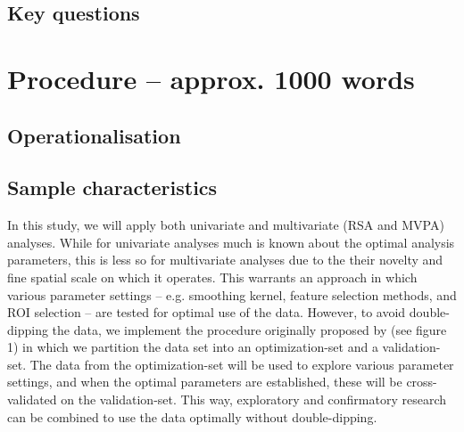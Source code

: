 \documentclass[12pt,a4paper]{article}\usepackage[]{graphicx}\usepackage[]{color}
\begin{document}
\subsection{Key questions}


\noindent
\wordcount 

\section{Procedure \textmd{– approx. 1000 words}}
\subsection{Operationalisation}

\subsection{Sample characteristics}
In this study, we will apply both univariate and multivariate (RSA and MVPA) analyses. While for univariate analyses much is known about the optimal analysis parameters, this is less so for multivariate analyses due to the their novelty and fine spatial scale on which it operates. This warrants an approach in which various parameter settings -- e.g. smoothing kernel, feature selection methods, and ROI selection -- are tested for optimal use of the data. However, to avoid double-dipping the data, we implement the procedure originally proposed by \cite{kriegeskorte2009} (see figure 1) in which we partition the data set into an optimization-set and a validation-set. The data from the optimization-set will be used to explore various parameter settings, and when the optimal parameters are established, these will be cross-validated on the validation-set. This way, exploratory and confirmatory research can be combined to use the data optimally without double-dipping. 
\end{document}
